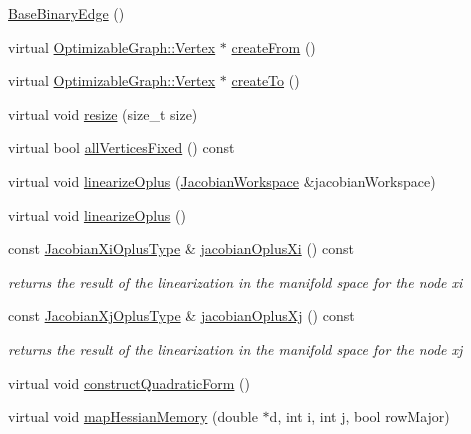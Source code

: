 \begin{DoxyCompactItemize}
\item 
\mbox{\hyperlink{classg2o_1_1_base_binary_edge_aacfc6e1d439f2f0fb09c6b069f478cf4}{Base\+Binary\+Edge}} ()
\item 
virtual \mbox{\hyperlink{classg2o_1_1_optimizable_graph_1_1_vertex}{Optimizable\+Graph\+::\+Vertex}} $\ast$ \mbox{\hyperlink{classg2o_1_1_base_binary_edge_a32bfc93b6dede619c7d99db2fb60f80d}{create\+From}} ()
\item 
virtual \mbox{\hyperlink{classg2o_1_1_optimizable_graph_1_1_vertex}{Optimizable\+Graph\+::\+Vertex}} $\ast$ \mbox{\hyperlink{classg2o_1_1_base_binary_edge_ac7cce17e3229445e5a33c3cb8a569320}{create\+To}} ()
\item 
virtual void \mbox{\hyperlink{classg2o_1_1_base_binary_edge_a06e64067fa5fff4a5e2d058249b55478}{resize}} (size\+\_\+t size)
\item 
virtual bool \mbox{\hyperlink{classg2o_1_1_base_binary_edge_adc9ce883a63aa7bdba86e552d72e1de9}{all\+Vertices\+Fixed}} () const
\item 
virtual void \mbox{\hyperlink{classg2o_1_1_base_binary_edge_afc3b6470e7679f027c2614484b394925}{linearize\+Oplus}} (\mbox{\hyperlink{classg2o_1_1_jacobian_workspace}{Jacobian\+Workspace}} \&jacobian\+Workspace)
\item 
virtual void \mbox{\hyperlink{classg2o_1_1_base_binary_edge_af0fb8a693c8c7996fa65566e7263fbc4}{linearize\+Oplus}} ()
\item 
const \mbox{\hyperlink{classg2o_1_1_base_binary_edge_ab1cde84224b129603bcd95db027e0167}{Jacobian\+Xi\+Oplus\+Type}} \& \mbox{\hyperlink{classg2o_1_1_base_binary_edge_a5232f0a5f116e7106b7968ab3bff036c}{jacobian\+Oplus\+Xi}} () const
\begin{DoxyCompactList}\small\item\em returns the result of the linearization in the manifold space for the node xi \end{DoxyCompactList}\item 
const \mbox{\hyperlink{classg2o_1_1_base_binary_edge_a83e5dec2135b33e86255c87be3b5d062}{Jacobian\+Xj\+Oplus\+Type}} \& \mbox{\hyperlink{classg2o_1_1_base_binary_edge_a71c1a583816399cf7db1a91ebe5dbf18}{jacobian\+Oplus\+Xj}} () const
\begin{DoxyCompactList}\small\item\em returns the result of the linearization in the manifold space for the node xj \end{DoxyCompactList}\item 
virtual void \mbox{\hyperlink{classg2o_1_1_base_binary_edge_a06a18745d95017c6d3c841f838a65364}{construct\+Quadratic\+Form}} ()
\item 
virtual void \mbox{\hyperlink{classg2o_1_1_base_binary_edge_ada358930854d386a4e8c32f64078e052}{map\+Hessian\+Memory}} (double $\ast$d, int i, int j, bool row\+Major)
\end{DoxyCompactItemize}
